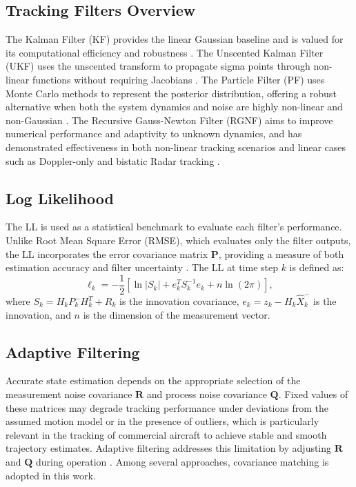 \documentclass[conference,10pt,a4paper]{IEEEtran}%
\begin{document}
\subsection{Tracking Filters Overview}
The Kalman Filter (KF) provides the linear Gaussian baseline and is valued for its computational efficiency and robustness \cite{Julier1997a}. The Unscented Kalman Filter (UKF) uses the unscented transform to propagate sigma points through non-linear functions without requiring Jacobians \cite{Julier1997a}. The Particle Filter (PF) uses Monte Carlo methods to represent the posterior distribution, offering a robust alternative when both the system dynamics and noise are highly non-linear and non-Gaussian \cite{Arulampalam2007, NJGordon}. The Recursive Gauss-Newton Filter (RGNF) aims to improve numerical performance and adaptivity to unknown dynamics, and has demonstrated effectiveness in both non-linear tracking scenarios and linear cases such as Doppler-only and bistatic Radar tracking \cite{Inggs1, De2015, roaldje}.

\subsection{Log Likelihood}                                    
The LL is used as a statistical benchmark to evaluate each filter's performance. Unlike Root Mean Square Error (RMSE), which evaluates only the filter outputs, the LL incorporates the error covariance matrix $\mathbf{P}$, providing a measure of both estimation accuracy and filter uncertainty \cite{labbe2014kalman, Grewal2006}. The LL at time step $k$ is defined as:
\begin{equation}                                               
  \ell_k = -\frac{1}{2}\left[\ln|S_k| + e_k^T S_k^{-1} e_k + n\ln(2\pi)\right],          
\end{equation}                                                                                                                                         
where $S_k = H_k P_k^- H_k^T + R_k$ is the innovation covariance, $e_k = z_k - H_k \hat{X}_k^-$ is the innovation, and $n$ is the dimension of the       
measurement vector.                                                                                                                                     
\subsection{Adaptive Filtering}                               
Accurate state estimation depends on the appropriate selection of the measurement noise covariance $\mathbf{R}$ and process noise covariance $\mathbf{Q}$. Fixed values of these matrices may degrade tracking performance under deviations from the assumed motion model or in the presence of outliers, which is particularly relevant in the tracking of commercial aircraft to achieve stable and smooth trajectory estimates. Adaptive filtering addresses this limitation by adjusting $\mathbf{R}$ and $\mathbf{Q}$ during operation \cite{Mehra1972}. Among several approaches, covariance matching is adopted in this work.
\end{document}
